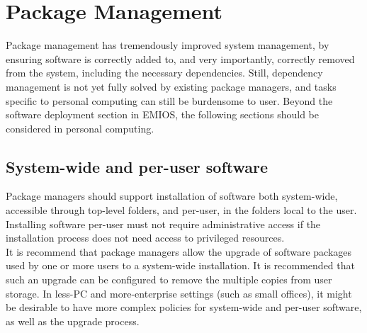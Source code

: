 \documentclass[a4paper,utf8,11pt]{article}
\begin{document}
	\section{Package Management}
	Package management has tremendously improved system management, by ensuring software is correctly added to, and very importantly, correctly removed from the system, including the necessary dependencies. Still, dependency management is not yet fully solved by existing package managers, and tasks specific to personal computing can still be burdensome to user. Beyond the software deployment section in EMIOS, the following sections should be considered in personal computing.
	\subsection{System-wide and per-user software}
	Package managers should support installation of software both system-wide, accessible through top-level folders, and per-user, in the folders local to the user. Installing software per-user must not require administrative access if the installation process does not need access to privileged resources.\\
	It is recommend that package managers allow the upgrade of software packages used by one or more users to a system-wide installation. It is recommended that such an upgrade can be configured to remove the multiple copies from user storage. In less-PC and more-enterprise settings (such as small offices), it might be desirable to have more complex policies for system-wide and per-user software, as well as the upgrade process.
\end{document}
